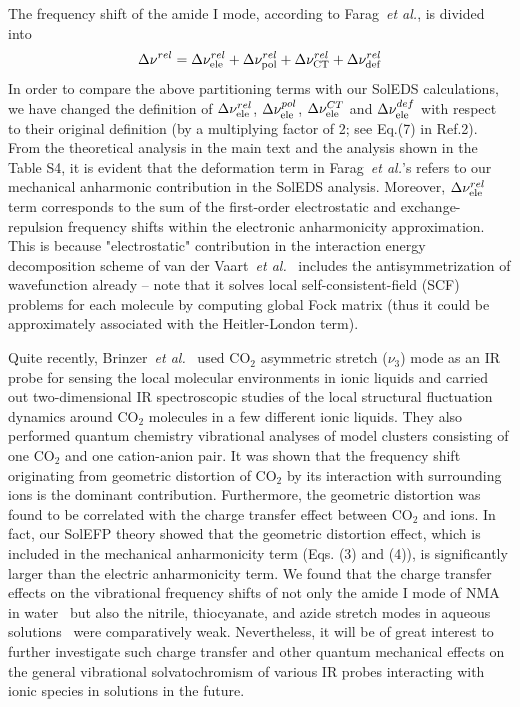 \documentclass[a4paper,titlepage,twoside,fleqn,12pt]{book}
\begin{document}
\begin{refsection}
The frequency shift of the amide I mode, according to Farag~\emph{et al.}, is divided into
%
\begin{equation} \label{e:cooo2}
 \Delta\nu^{rel} =  \Delta\nu_{\rm ele}^{rel} +
                    \Delta\nu_{\rm pol}^{rel} +
                    \Delta\nu_{\rm CT}^{rel} +
                    \Delta\nu_{\rm def}^{rel}
\end{equation}
%
In order to compare the above partitioning terms with our SolEDS calculations, we have
changed the definition of $\Delta\nu_{\rm ele}^{rel}$, $\Delta\nu_{\rm ele}^{pol}$,
$\Delta\nu_{\rm ele}^{CT}$ and $\Delta\nu_{\rm ele}^{def}$ with respect to their 
original definition (by a multiplying factor of 2; see Eq.(7) in Ref.2). 
From the theoretical analysis in the main text and the analysis shown in the 
Table S4, it is evident that the deformation term in Farag~\emph{et al.}’s 
refers to our mechanical anharmonic contribution in the SolEDS analysis.
Moreover, $\Delta\nu_{\rm ele}^{rel}$ term corresponds to the sum of the 
first\hyp{}order electrostatic and exchange\hyp{}repulsion frequency shifts 
within the electronic anharmonicity approximation. This is because 
"electrostatic" contribution in the interaction energy decomposition 
scheme of van der Vaart~\emph{et al.}~\citep{vanderVaart.Merz.JPCA.1999}  
includes the antisymmetrization of wavefunction 
already -- note that it solves local self\hyp{}consistent\hyp{}field (SCF) 
problems for each molecule by computing global Fock matrix 
(thus it could be approximately associated with the Heitler\hyp{}London term). 

Quite recently, 
Brinzer~\emph{et al.}~\citep{Brinzer.Berquist.Zhe.Dutta.Johnson.Krisher.Lambrecht.Garrett-Roe.JCP.2015} 
used CO$_2$ asymmetric
stretch ($\nu_3$) mode as an IR probe for sensing the local molecular
environments in ionic liquids and carried out two\hyp{}dimensional
IR spectroscopic studies of the local structural fluctuation dynamics
around CO$_2$ molecules in a few different ionic liquids.
They also performed quantum chemistry vibrational analyses
of model clusters consisting of one CO$_2$ and one cation-anion
pair. It was shown that the frequency shift originating from
geometric distortion of CO$_2$ by its interaction with surrounding
ions is the dominant contribution. Furthermore, the geometric
distortion was found to be correlated with the charge transfer
effect between CO$_2$ and ions. In fact, our SolEFP theory
showed that the geometric distortion effect, which is included
in the mechanical anharmonicity term (Eqs. (3) and (4)),
is significantly larger than the electric anharmonicity term.
We found that the charge transfer effects on the vibrational
frequency shifts of not only the amide I mode of NMA
in water~\citep{Blasiak.Cho.JCP.2014} but also the nitrile, thiocyanate, and
azide stretch modes in aqueous solutions~\citep{Lee.Choi.Cho.PCCP.2010} 
were comparatively
weak. Nevertheless, it will be of great interest to further
investigate such charge transfer and other quantum mechanical
effects on the general vibrational solvatochromism of various
IR probes interacting with ionic species in solutions in the
future.


\end{refsection}
\end{document}
